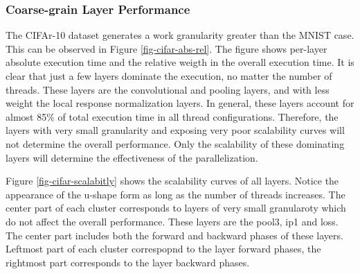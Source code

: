 \subsubsection{Coarse-grain Layer Performance}
The CIFAr-10 dataset generates a work granularity greater than 
the MNIST case. This can be observed in Figure \ref{fig-cifar-abs-rel}. 
The figure shows per-layer absolute execution time and the relative 
weigth in the overall execution time. It is clear that just a few 
layers dominate the execution, no matter the number of threads. 
These layers are the convolutional and pooling layers, and with 
less weight the local response normalization layers. In general, 
these layers account for almost 85\% of total execution time in 
all thread configurations. Therefore, the layers with very small 
granularity and exposing very poor scalability curves will not 
determine the overall performance. Only the scalability of these 
dominating layers will determine the effectiveness of the 
parallelization.

Figure \ref{fig-cifar-scalabitly} shows the scalability curves of all layers. 
Notice the appearance of the u-shape form as long as the number of threads 
increases. The center part of each cluster corresponds to layers of very 
small granularoty which do not affect the overall performance. These layers 
are the pool3, ip1 and loss. The center part includes both the forward 
and backward phases of these layers. Leftmost part of each cluster 
correspopnd to the layer forward phases, the rightmost part corresponds 
to the layer backward phases.

